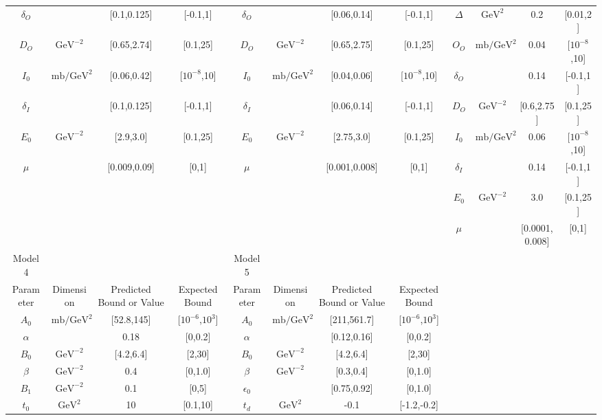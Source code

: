 \documentclass[11pt]{article}
\begin{document}
\begin{table}[htbp]
{\begin{tabular}{cccccccccccc}
				$\delta_O$ & & [0.1,0.125] & [-0.1,1] & $\delta_O$ & & [0.06,0.14] & [-0.1,1] & $\Delta$ & $\textrm{GeV}^{2}$ & 0.2 & [0.01,2] \\
				$D_O$ & $\textrm{GeV}^{-2}$ & [0.65,2.74] & [0.1,25] & $D_O$ & $\textrm{GeV}^{-2}$ & [0.65,2.75] & [0.1,25] & $O_O$ & $\text{mb}/\textrm{GeV}^{2}$ & 0.04 & [$10^{-8}$,10] \\
				$I_0$ & $\text{mb}/\textrm{GeV}^{2}$ & [0.06,0.42] & [$10^{-8}$,10] & $I_0$ & $\text{mb}/\textrm{GeV}^{2}$ & [0.04,0.06] & [$10^{-8}$,10] & $\delta_O$ & & 0.14 & [-0.1,1] \\
				$\delta_I$ & & [0.1,0.125] & [-0.1,1] & $\delta_I$ &  & [0.06,0.14] & [-0.1,1] & $D_O$ & $\textrm{GeV}^{-2}$ & [0.6,2.75] & [0.1,25] \\
				$E_0$ & $\textrm{GeV}^{-2}$ &  [2.9,3.0] & [0.1,25] & $E_0$ & $\textrm{GeV}^{-2}$ & [2.75,3.0] & [0.1,25] & $I_0$ & $\text{mb}/\textrm{GeV}^{2}$ & 0.06 & [$10^{-8}$,10] \\
				$\mu$ & & [0.009,0.09] & [0,1] & $\mu$ & & [0.001,0.008] & [0,1] & $\delta_I$ & & 0.14 & [-0.1,1] \\
				& & & & & & & & $E_0$ & $\textrm{GeV}^{-2}$ & 3.0 & [0.1,25] \\
				& & & & & & & & $\mu$ & & [0.0001,0.008] & [0,1] \\
				\midrule
				Model 4  &  &  & & Model 5 &  &  &  &  &  &  & \\
				\midrule
				Parameter & Dimension & Predicted Bound or Value & Expected Bound & Parameter & Dimension & Predicted Bound or Value & Expected Bound &  &  &  &  \\
				\specialrule{1.65pt}{1pt}{1pt}
				$A_0$ & $\text{mb}/\textrm{GeV}^{2}$ & [52.8,145] & [$10^{-6}$,$10^{3}$] & $A_0$ & $\text{mb}/\textrm{GeV}^{2}$ & [211,561.7] & [$10^{-6}$,$10^{3}$] &  &  &  &  \\
				$\alpha$ &  & 0.18 & [0,0.2] & $\alpha$ &  & [0.12,0.16] & [0,0.2] &  &  & & \\
				$B_0$ & $\textrm{GeV}^{-2}$ & [4.2,6.4] & [2,30] & $B_0$ & $\textrm{GeV}^{-2}$ & [4.2,6.4] & [2,30] &  &  &  & \\
				$\beta$ & $\textrm{GeV}^{-2}$ & 0.4 & [0,1.0] & $\beta$ & $\textrm{GeV}^{-2}$ & [0.3,0.4] & [0,1.0] &  &  &  & \\
				$B_1$ & $\textrm{GeV}^{-2}$ & 0.1 & [0,5] & $\epsilon_0$ &  & [0.75,0.92] & [0,1.0] &  &  &  &    \\
				$t_0$ & $\textrm{GeV}^{2}$ & 10 & [0.1,10] & $t_d$ & $\textrm{GeV}^{2}$ & -0.1 & [-1.2,-0.2] &  &  &  &  \\

\end{tabular}}
\end{table}
\end{document}
